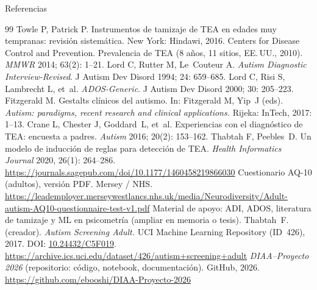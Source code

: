 \documentclass[11pt]{beamer}
\begin{document}
\begin{frame}[t,allowframebreaks]{Referencias}
  \scriptsize
  \begin{thebibliography}{99}
    Towle P, Patrick P. Instrumentos de tamizaje de TEA en edades muy tempranas: revisión sistemática. New York: Hindawi, 2016.
    Centers for Disease Control and Prevention. Prevalencia de TEA (8 años, 11 sitios, EE.\,UU., 2010). \emph{MMWR} 2014; 63(2): 1--21.
    Lord C, Rutter M, Le~Couteur A. \emph{Autism Diagnostic Interview-Revised}. J Autism Dev Disord 1994; 24: 659--685.
    Lord C, Risi S, Lambrecht L, et~al. \emph{ADOS-Generic}. J Autism Dev Disord 2000; 30: 205--223.
    Fitzgerald M. Gestalts clínicos del autismo. In: Fitzgerald M, Yip~J (eds). \emph{Autism: paradigms, recent research and clinical applications.} Rijeka: InTech, 2017: 1--13.
    Crane L, Chester J, Goddard~L, et~al. Experiencias con el diagnóstico de TEA: encuesta a padres. \emph{Autism} 2016; 20(2): 153--162.
    Thabtah F, Peebles~D. Un modelo de inducción de reglas para detección de TEA. \emph{Health Informatics Journal} 2020, 26(1): 264--286. \url{https://journals.sagepub.com/doi/10.1177/1460458219866030}
    Cuestionario AQ-10 (adultos), versión PDF. Mersey / NHS. \url{https://leademployer.merseywestlancs.nhs.uk/media/Neurodiversity/Adult-autism-AQ10-questionnaire-test-v1.pdf}
    Material de apoyo: ADI, ADOS, literatura de tamizaje y ML en psicometría (ampliar en memoria o tesis).
    Thabtah~F. (creador). \emph{Autism Screening Adult.} UCI Machine Learning Repository (ID~426), 2017. DOI: \href{https://doi.org/10.24432/C5F019}{10.24432/C5F019}. \url{https://archive.ics.uci.edu/dataset/426/autism+screening+adult}
    \emph{DIAA--Proyecto 2026} (repositorio: código, notebook, documentación). GitHub, 2026. \url{https://github.com/ebooshi/DIAA-Proyecto-2026}
  \end{thebibliography}
\end{frame}
\end{document}
